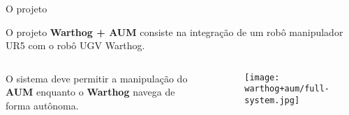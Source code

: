 \begin{frame}[t]{O projeto} 

    O projeto \textbf{Warthog + AUM} consiste na integração de um robô manipulador UR5 com o robô UGV Warthog.

    \vspace*{0.3cm}
        \begin{columns}[t]
            \begin{center}
                O sistema deve permitir a manipulação do \textbf{AUM} enquanto o \textbf{Warthog} navega de forma autônoma.
            \end{center}
            \begin{center}
                \begin{figure}
                    \texttt{[image: warthog+aum/full-system.jpg]}
                \end{figure}
            \end{center}
        \end{columns}
\end{frame}

